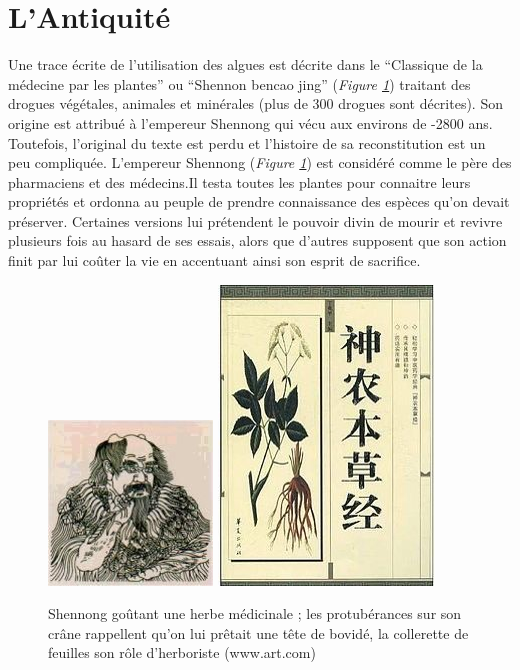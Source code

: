 \documentclass[
]{book}
\begin{document}
\hypertarget{lantiquituxe9}{%
\section{L'Antiquité}\label{lantiquituxe9}}

Une trace écrite de l'utilisation des algues est décrite dans le ``Classique de la médecine par les plantes'' ou ``Shennon bencao jing'' (\emph{Figure \ref{fig:shennong}}) traitant des drogues végétales, animales et minérales (plus de 300 drogues sont décrites). Son origine est attribué à l'empereur Shennong qui vécu aux environs de -2800 ans. Toutefois, l'original du texte est perdu et l'histoire de sa reconstitution est un peu compliquée. L'empereur Shennong (\emph{Figure \ref{fig:shennong}}) est considéré comme le père des pharmaciens et des médecins.Il testa toutes les plantes pour connaitre leurs propriétés et ordonna au peuple de prendre connaissance des espèces qu'on devait préserver. Certaines versions lui prétendent le pouvoir divin de mourir et revivre plusieurs fois au hasard de ses essais, alors que d'autres supposent que son action finit par lui coûter la vie en accentuant ainsi son esprit de sacrifice.

\begin{figure}

{\centering \includegraphics[width=0.4\linewidth]{images/shennong} \includegraphics[width=0.4\linewidth]{images/bencaojing} 

}

\caption{Shennong goûtant une herbe médicinale ; les protubérances sur son crâne rappellent qu’on lui prêtait une tête de bovidé, la collerette de feuilles son rôle d’herboriste (www.art.com)}\label{fig:shennong}
\end{figure}
\end{document}
